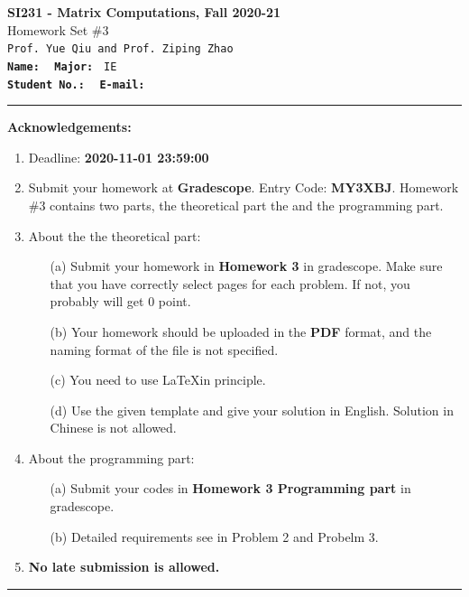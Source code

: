 \documentclass[english,onecolumn]{IEEEtran}
\begin{document}
\begin{center}
	\textbf{\LARGE{SI231 - Matrix Computations, Fall 2020-21}}\\
	{\Large Homework Set \#3}\\
	\texttt{Prof. Yue Qiu and Prof. Ziping Zhao}\\
	\texttt{\textbf{Name:}}   	\texttt{  }  		\hspace{1bp}
	\texttt{\textbf{Major:}}  	\texttt{ IE } 	\\
	\texttt{\textbf{Student No.:}} 	\texttt{ }     \hspace{1bp}
	\texttt{\textbf{E-mail:}} 	\texttt{ }
\par\end{center}



\noindent
\rule{\linewidth}{0.4pt}
{\bf {\large Acknowledgements:}}
\begin{enumerate}
    \item Deadline: \textbf{2020-11-01 23:59:00}
    \item Submit your homework at \textbf{Gradescope}. Entry Code: \textbf{MY3XBJ}. 
    Homework \#3 contains two parts, the theoretical part the and the programming part.
    \item About the the theoretical part:
    \begin{enumerate}
            \item[(a)] Submit your homework in \textbf{Homework 3} in gradescope. Make sure that you have correctly select pages for each problem. If not, you probably will get 0 point.
            \item[(b)] Your homework should be uploaded in the \textbf{PDF} format, and the naming format of the file is not specified.
            \item[(c)] You need to use \LaTeX in principle.
            \item[(d)] Use the given template and give your solution in English. Solution in Chinese is not allowed. 
        \end{enumerate}
  \item About the programming part:
  \begin{enumerate}
      \item[(a)] Submit your codes in \textbf{Homework 3 Programming part} in gradescope.
      \item[(b)] Detailed requirements see in Problem 2 and Probelm 3.
  \end{enumerate}
  \item \textbf{No late submission is allowed.}
\end{enumerate}
\rule{\linewidth}{0.4pt}
\newpage 
\end{document}
